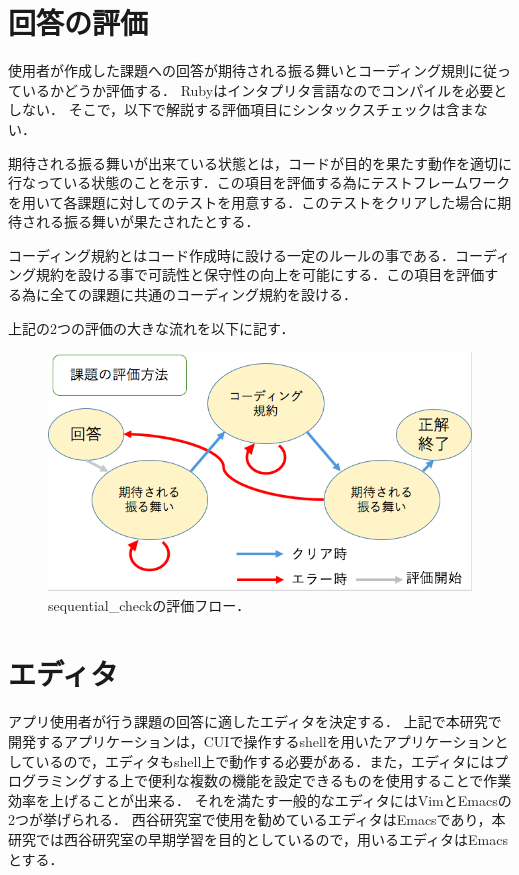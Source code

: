 \section{回答の評価}\label{evaluation}
使用者が作成した課題への回答が期待される振る舞いとコーディング規則に従っているかどうか評価する．
Rubyはインタプリタ言語なのでコンパイルを必要としない．
そこで，以下で解説する評価項目にシンタックスチェックは含まない．
\begin{description}
\def\labelenumi{\arabic{enumi}.}
\tightlist
\item[期待される振る舞い] 期待される振る舞いが出来ている状態とは，コードが目的を果たす動作を適切に行なっている状態のことを示す．この項目を評価する為にテストフレームワークを用いて各課題に対してのテストを用意する．このテストをクリアした場合に期待される振る舞いが果たされたとする．
\item[コーディング規約] コーディング規約とはコード作成時に設ける一定のルールの事である．コーディング規約を設ける事で可読性と保守性の向上を可能にする．この項目を評価する為に全ての課題に共通のコーディング規約を設ける．
\end{description}
上記の2つの評価の大きな流れを以下に記す．
\begin{figure}[H]
\centering
\begin{center}
\includegraphics[width=150mm]{../../picture/seq_flow.png}
\end{center}
\caption{sequential\_checkの評価フロー．\label{seq_flow}}
\end{figure}

\section{エディタ}\label{editor}
アプリ使用者が行う課題の回答に適したエディタを決定する．
上記で本研究で開発するアプリケーションは，CUIで操作するshellを用いたアプリケーションとしているので，エディタもshell上で動作する必要がある．また，エディタにはプログラミングする上で便利な複数の機能を設定できるものを使用することで作業効率を上げることが出来る．
それを満たす一般的なエディタにはVim\cite{Vim}とEmacs\cite{Emacs}の2つが挙げられる．
西谷研究室で使用を勧めているエディタはEmacsであり，本研究では西谷研究室の早期学習を目的としているので，用いるエディタはEmacsとする．

